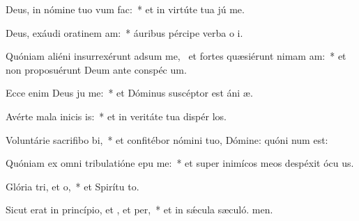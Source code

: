 \item Deus, in nómine tuo vum  fac:~* et in virtúte tua jú me.
\item Deus, exáudi oratinem am:~* áuribus pércipe verba o i.
\item Quóniam aliéni insurrexérunt adsum me,~\pscross{} et fortes quæsiérunt nimam am:~* et non proposuérunt Deum ante conspéc um.
\item Ecce enim Deus ju me:~* et Dóminus suscéptor est áni æ.
\item Avérte mala inicis is:~* et in veritáte tua dispér los.
\item Voluntárie sacrifibo bi,~* et confitébor nómini tuo, Dómine: quóni num est:
\item Quóniam ex omni tribulatióne epu me:~* et super inimícos meos despéxit ócu us.
\item Glória tri, et o,~* et Spirítu to.
\item Sicut erat in princípio, et , et per,~* et in sǽcula sæculó. men.
